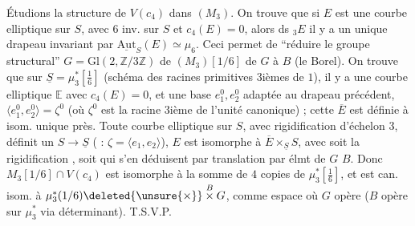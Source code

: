 Étudions la structure de $V(c_4)$ dans $(M_3)$. On trouve que si $E$ est une courbe elliptique sur $S$, avec $6$ inv. sur $S$ et $c_4(E)=0$, alors ds $\mathord{}_3E$ il y a un unique drapeau invariant par $\underline{\mathrm{Aut}}_S(E)\simeq\mu_6$. Ceci permet de ``réduire le groupe structural'' $G=\mathrm{Gl}(2,\mathbb Z/3\mathbb Z)$ de $(M_3)[1/6]$ de $G$ à $B$ (le Borel). On trouve que sur $\underline S=\mu_3^*[\frac16]$ (schéma des racines primitives 3ièmes de $1$),  il y a une courbe elliptique $\mathbb E$ avec $c_4(E)=0$, et une base $e_1^0,e_2^0$ adaptée au drapeau précédent, $\langle e_1^0,e_2^0\rangle=\zeta^0$ (où $\zeta^0$ est la racine 3ième de l'unité canonique) ; cette $\overline E$ est définie à isom. unique près. Toute courbe elliptique  sur $S$, avec rigidification  d'échelon 3, définit un $S\longrightarrow\underline S$ ( : $\zeta=\langle e_1,e_2\rangle$),  $E$ est isomorphe à $\overline E\times_{\underline S} S$, avec  soit la rigidification , soit  qui s'en déduisent par translation par élmt de $G$  $B$. Donc $M_3[1/6]\cap V(c_4)$ est isomorphe à la somme de $4$ copies de $\mu_3^*[\frac16]$, et est can. isom. à $\mu_3^*(1/6)\deleted{\unsure{\times}} \mathbin{\overset B\times}G$, comme espace où $G$ opère ($B$ opère sur $\mu_3^*$ via déterminant). T.S.V.P.
